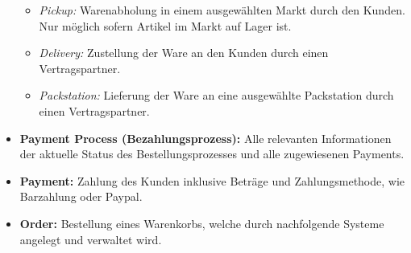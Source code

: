 \begin{itemize}
	\begin{itemize}[noitemsep,nolistsep]
		\item \textit{Pickup: } {Warenabholung in einem ausgewählten Markt durch den Kunden. Nur möglich sofern Artikel im Markt auf Lager ist.}
		\item \textit{Delivery: } {Zustellung der Ware an den Kunden durch einen Vertragspartner.}
		\item \textit{Packstation: } {Lieferung der Ware an eine ausgewählte Packstation durch einen Vertragspartner.}
	\end{itemize}
	\item \textbf{Payment Process (Bezahlungsprozess): } {Alle relevanten Informationen der aktuelle Status des Bestellungsprozesses und alle zugewiesenen Payments.}
	\item \textbf{Payment: } {Zahlung des Kunden inklusive Beträge und Zahlungsmethode, wie Barzahlung oder Paypal.}
	\item \textbf{Order: } {Bestellung eines Warenkorbs, welche durch nachfolgende Systeme angelegt und verwaltet wird.}
\end{itemize}
\vspace{0.4em}

